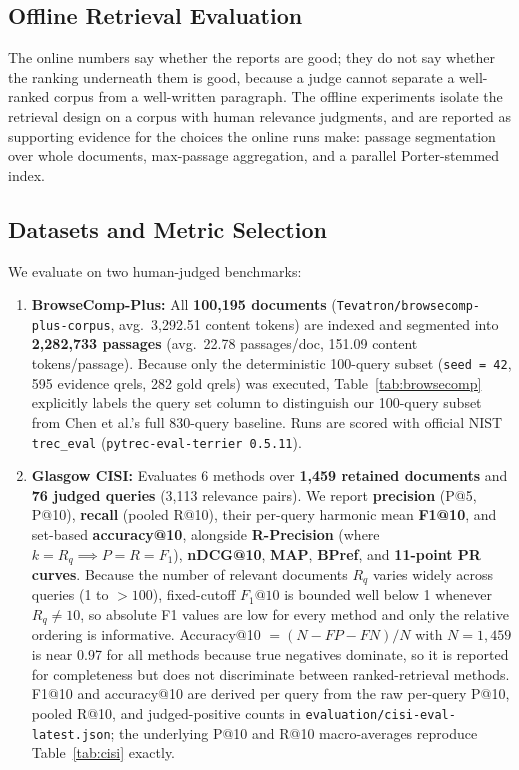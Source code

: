 \documentclass[conference]{IEEEtran}
\begin{document}
\subsection{Offline Retrieval Evaluation}

The online numbers say whether the reports are good; they do not say whether the ranking underneath them
is good, because a judge cannot separate a well-ranked corpus from a well-written paragraph. The offline
experiments isolate the retrieval design on a corpus with human relevance judgments, and are reported as
supporting evidence for the choices the online runs make: passage segmentation over whole documents,
max-passage aggregation, and a parallel Porter-stemmed index.


\subsection{Datasets and Metric Selection}
We evaluate on two human-judged benchmarks:
\begin{enumerate}
    \item \textbf{BrowseComp-Plus:} All \textbf{100,195 documents} (\texttt{Tevatron/browsecomp-plus-corpus}, avg.\ 3,292.51 content tokens) are indexed and segmented into \textbf{2,282,733 passages} (avg.\ 22.78 passages/doc, 151.09 content tokens/passage). Because only the deterministic 100-query subset (\texttt{seed = 42}, 595 evidence qrels, 282 gold qrels) was executed, Table~\ref{tab:browsecomp} explicitly labels the query set column to distinguish our 100-query subset from Chen et al.'s full 830-query baseline. Runs are scored with official NIST \texttt{trec\_eval} (\texttt{pytrec-eval-terrier 0.5.11}).
    \item \textbf{Glasgow CISI:} Evaluates 6 methods over \textbf{1,459 retained documents} and \textbf{76 judged queries} (3,113 relevance pairs). We report \textbf{precision} (P@5, P@10), \textbf{recall} (pooled R@10), their per-query harmonic mean \textbf{F1@10}, and set-based \textbf{accuracy@10}, alongside \textbf{R-Precision} (where $k = R_q \implies P = R = F_1$), \textbf{nDCG@10}, \textbf{MAP}, \textbf{BPref}, and \textbf{11-point PR curves}. Because the number of relevant documents $R_q$ varies widely across queries (1 to $>100$), fixed-cutoff $F_1@10$ is bounded well below 1 whenever $R_q \neq 10$, so absolute F1 values are low for every method and only the relative ordering is informative. Accuracy@10 $= (N - FP - FN)/N$ with $N = 1{,}459$ is near 0.97 for all methods because true negatives dominate, so it is reported for completeness but does not discriminate between ranked-retrieval methods. F1@10 and accuracy@10 are derived per query from the raw per-query P@10, pooled R@10, and judged-positive counts in \texttt{evaluation/cisi-eval-latest.json}; the underlying P@10 and R@10 macro-averages reproduce Table~\ref{tab:cisi} exactly.
\end{enumerate}
\end{document}
